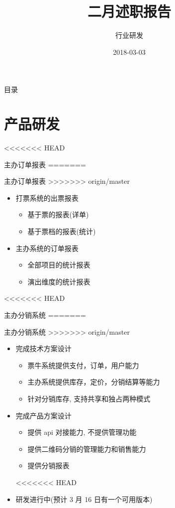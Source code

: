 \documentclass[presentation, bigger]{beamer}
\author{行业研发}
\date{2018-03-03}
\title{二月述职报告}
\begin{document}
\maketitle
\begin{frame}{目录}
\tableofcontents
\end{frame}


\section{产品研发}
<<<<<<< HEAD
\label{sec:orgfb35fb9}
\begin{frame}[label={sec:orgb81fa7f}]{主办订单报表}
=======
\label{sec:orgfac02c6}
\begin{frame}[label={sec:orgc082391}]{主办订单报表}
>>>>>>> origin/master
\begin{itemize}
\item 打票系统的出票报表
\begin{itemize}
\item 基于票的报表(详单)
\item 基于票档的报表(统计)
\end{itemize}
\item 主办系统的订单报表
\begin{itemize}
\item 全部项目的统计报表
\item 演出维度的统计报表
\end{itemize}
\end{itemize}
\end{frame}

<<<<<<< HEAD
\begin{frame}[label={sec:org37bc7b4}]{主办分销系统}
=======
\begin{frame}[label={sec:orgbe7b56c}]{主办分销系统}
>>>>>>> origin/master
\begin{itemize}
\item 完成技术方案设计
\begin{itemize}
\item 票牛系统提供支付，订单，用户能力
\item 主办系统提供库存，定价，分销结算等能力
\item 针对分销库存, 支持共享和独占两种模式
\end{itemize}
\item 完成产品方案设计
\begin{itemize}
\item 提供 api 对接能力, 不提供管理功能
\item 提供二维码分销的管理能力和销售能力
\item 提供分销报表
\end{itemize}
<<<<<<< HEAD
\item 研发进行中(预计 3 月 16 日有一个可用版本)
\end{itemize}
\end{frame}


\end{frame}
\end{frame}
\end{document}
